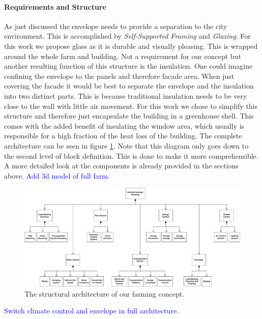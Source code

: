 \paragraph{Requirements and Structure}
As just discussed the envelope needs to provide a separation to the city environment.
This is accomplished by \textit{Self-Supported Framing} and \textit{Glazing}.
For this work we propose glass as it is durable and visually pleasing.
This is wrapped around the whole farm and building.
Not a requirement for our concept but another resulting function of this structure is the insulation.
One could imagine confining the envelope to the panels and therefore facade area.
When just covering the facade it would be best to separate the envelope and the insulation into two distinct parts.
This is because traditional insulation needs to be very close to the wall with little air movement.
For this work we chose to simplify this structure and therefore just encapsulate the building in a greenhouse shell.
This comes with the added benefit of insulating the window area, which usually is responsible for a high fraction of the heat loss of the building.
The complete architecture can be seen in figure \ref{fig:architecture}.
Note that this diagram only goes down to the second level of block definition.
This is done to make it more comprehensible.
A more detailed look at the components is already provided in the sections above.%
\textcolor{Blue}{Add 3d model of full farm}.

\begin{figure}[htbp]
  \centering
  \includegraphics[width=\textwidth]{img/architecture/architecture.pdf}
  \caption{The structural architecture of our farming concept.}
  \label{fig:architecture}
\end{figure}
\textcolor{Blue}{Switch climate control and envelope in full architecture.}

